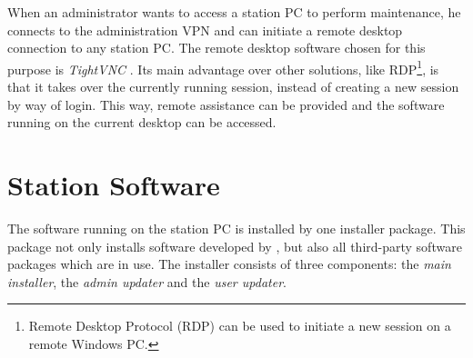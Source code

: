 When an administrator wants to access a station PC to perform maintenance, he
connects to the administration VPN and can initiate a remote desktop connection
to any station PC.  The remote desktop software chosen for this purpose is
\emph{TightVNC} \cite{TightVNC}.  Its main advantage over other solutions,
like RDP\footnote{Remote Desktop Protocol (RDP) can be used to initiate a new session
on a remote Windows PC.}, is that it takes over the currently running session,
instead of creating a new session by way of login.  This way, remote assistance
can be provided and the software running on the current desktop can be accessed.


\section{Station Software}

The software running on the \hisparc station PC is installed by one installer
package.  This package not only installs software developed by \hisparc, but
also all third-party software packages which are in use.  The installer consists
of three components: the \emph{main installer}, the \emph{admin updater} and the
\emph{user updater}.

